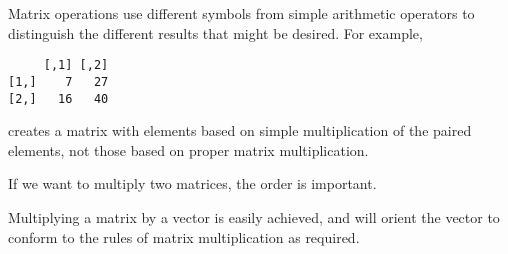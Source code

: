 Matrix operations use different symbols from simple arithmetic operators to distinguish the different results that might be desired. For example, 
\begin{knitrout}
\color{fgcolor}\begin{kframe}
\begin{alltt}
\hlstd{> }\hlkwb{=}\hlstd{(}\hlopt{:}\hlstd{,} \hlstd{=}\hlstd{)}
\hlstd{> }\hlkwb{=}\hlstd{(}\hlopt{:}\hlstd{,} \hlstd{=}\hlstd{)}
\hlstd{> }\hlopt{*}
\end{alltt}
\begin{verbatim}
     [,1] [,2]
[1,]    7   27
[2,]   16   40
\end{verbatim}
\end{kframe}
\end{knitrout}
creates a matrix with elements based on simple multiplication of the paired elements, not those based on proper matrix multiplication. 
 
If we want to multiply two matrices, the order is important. 
\begin{knitrout}
\color{fgcolor}
\end{knitrout}
 
Multiplying a matrix by a vector is easily achieved, and \R{} will orient the vector to conform to the rules of matrix multiplication as required. 
\begin{knitrout}
\color{fgcolor}
\end{knitrout}
 
